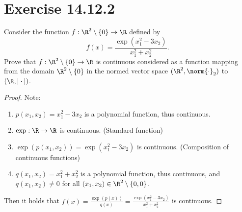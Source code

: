\documentclass{assignment}
\begin{document}
\section{Exercise 14.12.2}
\begin{problem}
    Consider the function $f: \R^2\setminus\{0\} \to \R$ defined by
    $$f(x) = \frac{\exp(x_1^2-3x_2)}{x_1^2+x_2^2}.$$
    Prove that $f:\R^2\setminus\{0\}\to\R$ is continuous considered as a function mapping from the domain $\R^2\setminus\{0\}$ in
    the normed vector space $(\R^2, \norm{\cdot}_2)$ to $(\R, |\cdot|)$.
\end{problem}
\begin{proof}
    Note: 
    \begin{enumerate}
        \item $p(x_1,x_2) = x_1^2 - 3x_2$ is a polynomial function, thus continuous.
        \item $\exp: \R \to \R$ is continuous. (Standard function)
        \item $\exp(p(x_1,x_2)) = \exp(x_1^2-3x_2)$ is continuous. (Composition of continuous functions)
        \item $q(x_1,x_2) = x_1^2+x_2^2$ is a polynomial function, thus continuous, and $q(x_1,x_2) \ne 0$ for all $(x_1,x_2) \in \R^2\setminus\{0,0\}$.
    \end{enumerate}

    Then it holds that $f(x) = \frac{\exp(p(x))}{q(x)} = \frac{\exp(x_1^2-3x_2)}{x_1^2+x_2^2}$ is continuous.
\end{proof}
\end{document}
